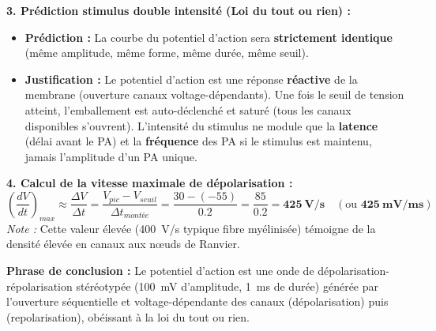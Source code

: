 \documentclass[11pt]{article}
\begin{document}
\begin{exoresolu}
\textbf{3. Prédiction stimulus double intensité (Loi du tout ou rien) :}
\begin{itemize}
    \item \textbf{Prédiction :} La courbe du potentiel d'action sera \textbf{strictement identique} (même amplitude, même forme, même durée, même seuil).
    \item \textbf{Justification :} Le potentiel d'action est une réponse \textbf{réactive} de la membrane (ouverture canaux voltage-dépendants). Une fois le seuil de tension atteint, l'emballement  est auto-déclenché et saturé (tous les canaux  disponibles s'ouvrent). L'intensité du stimulus ne module que la \textbf{latence} (délai avant le PA) et la \textbf{fréquence} des PA si le stimulus est maintenu, jamais l'amplitude d'un PA unique.
\end{itemize}

\textbf{4. Calcul de la vitesse maximale de dépolarisation :}
\[ \left( \frac{dV}{dt} \right)_{max} \approx \frac{\Delta V}{\Delta t} = \frac{V_{pic} - V_{seuil}}{\Delta t_{montée}} = \frac{30 - (-55)}{0.2} = \frac{85}{0.2} = \mathbf{425\ V/s} \quad (\text{ou } \mathbf{425\ mV/ms}) \]
\textit{Note :} Cette valeur élevée (\SI{400}{V/s} typique fibre myélinisée) témoigne de la densité élevée en canaux  aux nœuds de Ranvier.

\textbf{Phrase de conclusion :} Le potentiel d'action est une onde de dépolarisation-répolarisation stéréotypée (\SI{100}{mV} d'amplitude, \SI{1}{ms} de durée) générée par l'ouverture séquentielle et voltage-dépendante des canaux  (dépolarisation) puis  (repolarisation), obéissant à la loi du tout ou rien.
\end{exoresolu}
\end{document}
